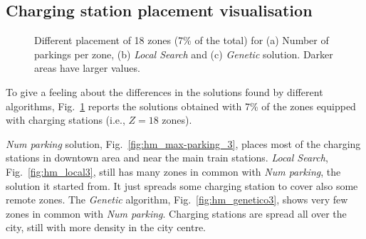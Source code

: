 \documentclass[review, letterpaper,3p, 11pt]{elsarticle}
\begin{document}
\subsection{Charging station placement visualisation}

\begin{figure}[h!]
    \centering     %
    \caption{Different placement of 18 zones (7\% of the total) for (a) Number of parkings per zone, (b) \textit{Local Search}  and (c) \textit{Genetic} solution. Darker areas have larger values.}
    \label{fig:maps}
\end{figure}

To give a feeling about the differences in the solutions found by different algorithms, Fig.~\ref{fig:maps} reports the solutions obtained with 7\% of the zones equipped with charging stations (i.e., $Z=18$ zones). %

\textit{Num parking} solution, Fig.~\ref{fig:hm_max-parking_3}, places most of the charging stations in downtown area and near the main train stations. 
\textit{Local Search}, Fig.~\ref{fig:hm_local3}, still has many zones in common with \textit{Num parking}, the solution it started from. It just spreads some charging station to cover also some remote zones.
The \textit{Genetic} algorithm, Fig.~\ref{fig:hm_genetico3}, shows very few zones in common with \textit{Num parking}. Charging stations are spread all over the city, still with more density in the city centre. %
\end{document}
